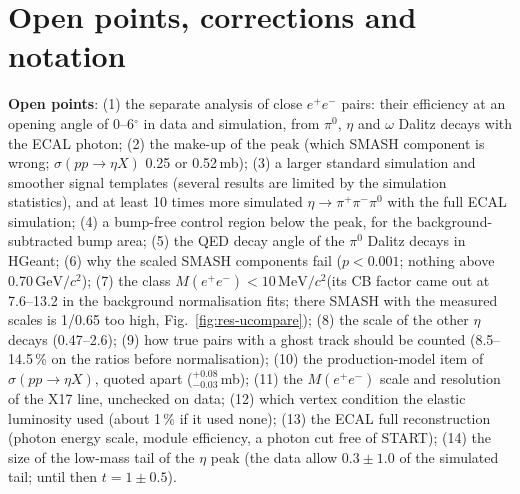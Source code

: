 \documentclass[11pt,a4paper]{article}
\newcommand{\piz}{\ensuremath{\pi^{0}}\xspace}
\newcommand{\ee}{\ensuremath{e^{+}e^{-}}\xspace}
\newcommand{\pipi}{\ensuremath{\pi^{+}\pi^{-}}\xspace}
\newcommand{\Mee}{\ensuremath{M(e^{+}e^{-})}\xspace}
\newcommand{\GeVcc}{\ensuremath{\mathrm{GeV}/c^{2}}\xspace}
\newcommand{\MeVcc}{\ensuremath{\mathrm{MeV}/c^{2}}\xspace}
\newcommand{\sigeta}{\ensuremath{\sigma(pp\to\eta X)}\xspace}
\begin{document}
\section{Open points, corrections and notation}
\label{sec:open}
\textbf{Open points}: (1) the separate analysis of close \ee pairs: their efficiency at an opening angle of 0--6$^\circ$ in data and simulation,
from \piz, $\eta$ and $\omega$ Dalitz decays with the ECAL photon; (2) the make-up of the peak (which SMASH component is wrong; \sigeta 0.25 or
0.52\,mb); (3) a larger standard simulation and smoother signal templates (several results are limited by the simulation statistics), and at least
10 times more simulated $\eta\to\pipi\piz$ with the full ECAL simulation; (4) a bump-free control region below the peak, for the
background-subtracted bump area; (5) the QED decay angle of the \piz Dalitz decays in HGeant; (6) why the scaled SMASH components fail ($p<0.001$;
nothing above 0.70\,\GeVcc); (7) the class \Mee$<10$\,\MeVcc (its CB factor came out at 7.6--13.2 in the background normalisation fits; there SMASH with the measured scales is 1/0.65 too high,
Fig.~\ref{fig:res-ucompare}); (8) the scale of the other $\eta$ decays (0.47--2.6); (9) how true pairs with a ghost track should be counted
(8.5--14.5\,\% on the ratios before normalisation); (10) the production-model item of \sigeta, quoted apart ($^{+0.08}_{-0.03}$\,mb); (11) the
\Mee scale and resolution of the X17 line, unchecked on data; (12) which vertex condition the elastic luminosity used (about 1\,\% if it used
none); (13) the ECAL full reconstruction (photon energy scale, module efficiency, a photon cut free of START); (14) the size of the low-mass tail of the $\eta$ peak (the data allow $0.3\pm1.0$ of the simulated tail; until then
$t=1\pm0.5$).
\end{document}
